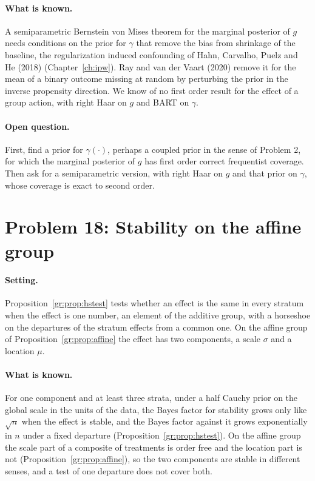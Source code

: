 \paragraph{What is known.} A semiparametric Bernstein von Mises theorem for the marginal posterior of $g$ needs conditions on the prior for $\gamma$ that remove the bias from shrinkage of the baseline, the regularization induced confounding of Hahn, Carvalho, Puelz and He (2018) (Chapter~\ref{ch:ipw}). Ray and van der Vaart (2020) remove it for the mean of a binary outcome missing at random by perturbing the prior in the inverse propensity direction. We know of no first order result for the effect of a group action, with right Haar on $g$ and BART on $\gamma$.

\paragraph{Open question.} First, find a prior for $\gamma(\cdot)$, perhaps a coupled prior in the sense of Problem 2, for which the marginal posterior of $g$ has first order correct frequentist coverage. Then ask for a semiparametric version, with right Haar on $g$ and that prior on $\gamma$, whose coverage is exact to second order.

\section{Problem 18: Stability on the affine group}

\paragraph{Setting.} Proposition~\ref{gr:prop:hstest} tests whether an effect is the same in every stratum when the effect is one number, an element of the additive group, with a horseshoe on the departures of the stratum effects from a common one. On the affine group of Proposition~\ref{gr:prop:affine} the effect has two components, a scale $\sigma$ and a location $\mu$.

\paragraph{What is known.} For one component and at least three strata, under a half Cauchy prior on the global scale in the units of the data, the Bayes factor for stability grows only like $\sqrt n$ when the effect is stable, and the Bayes factor against it grows exponentially in $n$ under a fixed departure (Proposition~\ref{gr:prop:hstest}). On the affine group the scale part of a composite of treatments is order free and the location part is not (Proposition~\ref{gr:prop:affine}), so the two components are stable in different senses, and a test of one departure does not cover both.


